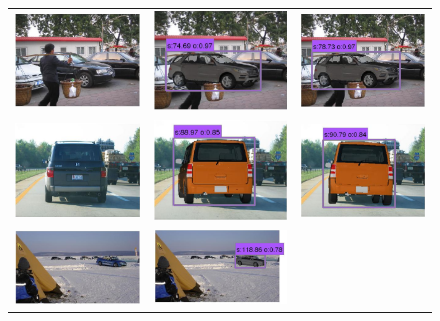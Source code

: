 \documentclass[10pt,twocolumn,letterpaper]{article}
\begin{document}
\begin{figure}[h]
\begin{tabular}{ccc}
  \includegraphics[width=0.22\linewidth]{supp/tuning_3a.png} &
  \includegraphics[width=0.22\linewidth]{supp/tuning_3b.png} & 
  \includegraphics[width=0.22\linewidth]{supp/tuning_3c.png}  \\   
  \includegraphics[width=0.22\linewidth]{supp/tuning_4a.png} &
  \includegraphics[width=0.22\linewidth]{supp/tuning_4b.png} & 
  \includegraphics[width=0.22\linewidth]{supp/tuning_4c.png}  \\     
  \includegraphics[width=0.22\linewidth]{supp/tuning_5a.png} &
  \includegraphics[width=0.22\linewidth]{supp/tuning_5b.png} & 

\end{tabular}
\end{figure}
\end{document}
